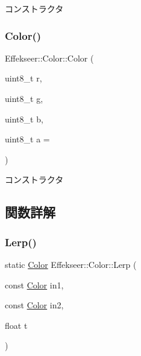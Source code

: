 コンストラクタ 

\mbox{\label{struct_effekseer_1_1_color_ace968f910830ff624662b5371b559703}} 
\subsubsection{\texorpdfstring{Color()}{Color()}\hspace{0.1cm}{\footnotesize\ttfamily [2/2]}}
{\footnotesize\ttfamily Effekseer\+::\+Color\+::\+Color (\begin{DoxyParamCaption}\item[{uint8\+\_\+t}]{r,  }\item[{uint8\+\_\+t}]{g,  }\item[{uint8\+\_\+t}]{b,  }\item[{uint8\+\_\+t}]{a = {} }\end{DoxyParamCaption})}



コンストラクタ 



\subsection{関数詳解}
\mbox{\label{struct_effekseer_1_1_color_a7dba2d9c1af67782f60f5968c8bcb32d}} 
\subsubsection{\texorpdfstring{Lerp()}{Lerp()}}
{\footnotesize\ttfamily static \mbox{\hyperlink{struct_effekseer_1_1_color}{Color}} Effekseer\+::\+Color\+::\+Lerp (\begin{DoxyParamCaption}\item[{const \mbox{\hyperlink{struct_effekseer_1_1_color}{Color}}}]{in1,  }\item[{const \mbox{\hyperlink{struct_effekseer_1_1_color}{Color}}}]{in2,  }\item[{float}]{t }\end{DoxyParamCaption})\hspace{0.3cm}{\ttfamily [static]}}



